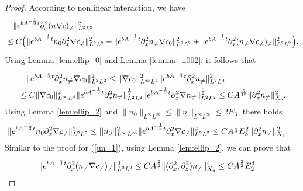 \documentclass[12pt, reqno]{amsart}
\numberwithin{equation}{section}
\begin{document}
\begin{proof}
		 According to nonlinear interaction, we have
		\begin{equation}\label{nc_1}
			\begin{aligned}
				&\quad\|{\rm e}^{bA^{-\frac{1}{3}}t}\partial_x^2(n\nabla c)_{\neq}\|^2_{L^2L^2} \\
				&\leq C\Big(
				\|{\rm e}^{bA^{-\frac{1}{3}}t}n_0\partial_x^2\nabla c_{\neq}\|^2_{L^2L^2}
				+\|{\rm e}^{bA^{-\frac{1}{3}}t}\partial_x^2n_{\neq}\nabla c_{0}\|^2_{L^2L^2}
				+\|{\rm e}^{bA^{-\frac{1}{3}}t}\partial_x^2(n_{\neq} \nabla c_{\neq})_{\neq}\|^2_{L^2L^2}\Big).
			\end{aligned}
		\end{equation}
		Using Lemma \ref{lem:ellip_0} and Lemma \ref{lemma_n002}, it follows that
		\begin{equation}\label{nc_2}
			\begin{aligned}	
				&\quad\|{\rm e}^{bA^{-\frac{1}{3}}t}\partial_x^2n_{\neq}\nabla c_{0}\|^2_{L^2L^2}
				\leq
				\|\nabla c_{0}\|^2_{L^{\infty}L^{4}}
				\|{\rm e}^{bA^{-\frac{1}{3}}t}\partial_x^2n_{\neq}\|^2_{L^2L^4} \\
				&\leq C
				\|\nabla c_{0}\|_{L^{\infty}L^{4}}^2
				\|{\rm e}^{bA^{-\frac{1}{3}}t}\partial_x^2n_{\neq}\|^{\frac12}_{L^2L^2}
				\|{\rm e}^{bA^{-\frac{1}{3}}t}\partial_x^2\nabla n_{\neq}\|^{\frac32}_{L^2L^2}
				\leq CA^{\frac{5}{12}}
				\|\partial_x^2n_{\neq}\|^2_{X_b}.
			\end{aligned}
		\end{equation}
		Using Lemma \ref{lem:ellip_2} and $\|n_0\|_{L^{\infty}L^{\infty}}\leq \|n\|_{L^{\infty}L^{\infty}}\leq 2E_3$, there holds 
		\begin{equation}\label{nc_3}
			\begin{aligned}
				\|{\rm e}^{bA^{-\frac{1}{3}}t}n_0\partial_x^2\nabla c_{\neq}\|_{L^2L^2}^2
				&\leq ||n_0||_{L^{\infty}L^{\infty}}^2
				\|{\rm e}^{bA^{-\frac{1}{3}}t}\partial_x^2\nabla c_{\neq}\|^2_{L^2L^2}
				\leq CA^{\frac{1}{3}}E_3^2||\partial_x^2n_{\neq}||^2_{X_b}.
			\end{aligned}
		\end{equation}
		Similar to the proof for (\ref{un_1}), using Lemma \ref{lem:ellip_2}, we can prove that 
		\begin{equation}\label{nc_4}
			\begin{aligned}
				\|{\rm e}^{bA^{-\frac{1}{3}}t}\partial_x^2(n_{\neq} \nabla c_{\neq})_{\neq}\|_{L^2L^2}^2
				&\leq CA^{\frac{2}{3}}\|(\partial_x^2,\partial_z^2)n_{\neq}\|^4_{X_a}
				\leq CA^{\frac{2}{3}}E_2^4.

\end{aligned}
\end{equation}
\end{proof}
\end{document}
